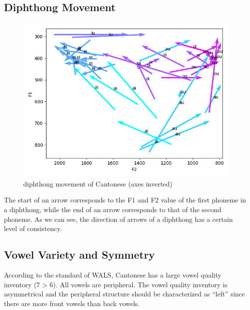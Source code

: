 \documentclass[a4paper]{article}
\begin{document}
\subsection{Diphthong Movement}
\begin{figure}[H]
    \centering
    \includegraphics[scale=0.6]{imgs/diphthong_movement.png}
    \caption{diphthong movement of Cantonese (axes inverted)}
\end{figure}
The start of an arrow corresponds to the F1 and F2 value of the first phoneme in a diphthong, while the end of an arrow corresponds to that of the second phoneme. As we can see, the direction of arrows of a diphthong has a certain level of consistency.

\subsection{Vowel Variety and Symmetry}
According to the standard of WALS, Cantonese has a large vowel quality inventory (7 > 6). All vowels are peripheral. The vowel quality inventory is asymmetrical and the peripheral structure should be characterized as ``left'' since there are more front vowels than back vowels. 
\end{document}
